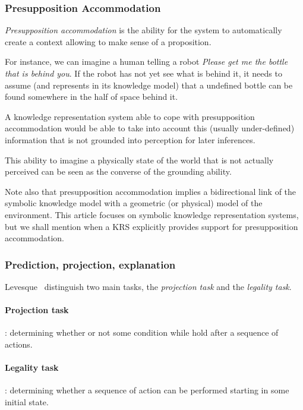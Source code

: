 \subsubsection{Presupposition Accommodation}
\label{sect|presupposition-accommodation}

\emph{Presupposition accommodation} is the ability for the system to
automatically create a context allowing to make sense of a proposition.

For instance, we can imagine a human telling a robot \emph{Please get me the
bottle that is behind you}. If the robot has not yet see what is behind it, it
needs to assume (and represents in its knowledge model) that a undefined bottle
can be found somewhere in the half of space behind it.

A knowledge representation system able to cope with presupposition
accommodation would be able to take into account this (usually under-defined)
information that is not grounded into perception for later inferences.

This ability to imagine a physically state of the world that is not actually
perceived can be seen as the converse of the grounding ability.

Note also that presupposition accommodation implies a bidirectional link of the
symbolic knowledge model with a geometric (or physical) model of the
environment. This article focuses on symbolic knowledge representation systems,
but we shall mention when a KRS explicitly provides support for presupposition
accommodation.

\subsubsection{Prediction, projection, explanation}
\label{sect|prediction-projection}

Levesque~\cite{Levesque2008} distinguish two main tasks, the \emph{projection
task} and the \emph{legality task}.

\paragraph{Projection task}: determining whether or not some condition while
hold after a sequence of actions.

\paragraph{Legality task}: determining whether a sequence of action can be
performed starting in some initial state.

